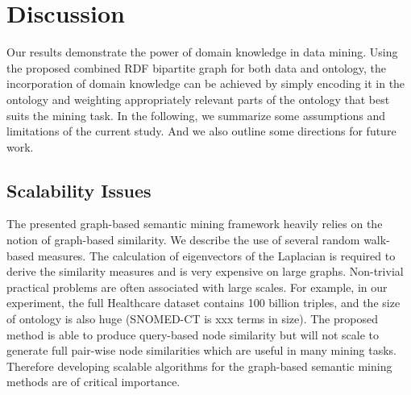 \section{Discussion}
\label{sec:discussion}

Our results demonstrate the power of domain knowledge in data mining. Using the proposed combined RDF bipartite graph for both data and ontology, the incorporation of domain knowledge can be achieved by simply encoding it in the ontology and weighting appropriately relevant parts of the ontology that best suits the mining task. In the following, we summarize some assumptions and limitations of
the current study. And we also outline some directions for future work. 

\subsection{Scalability Issues}

The presented graph-based semantic mining framework heavily relies on the notion of graph-based similarity. We describe the use of several random walk-based measures. The calculation of eigenvectors of the Laplacian is required to derive the similarity measures and is very expensive on large graphs. Non-trivial practical problems are often associated with large scales. For example, in our experiment, the full Healthcare dataset contains 100 billion triples, and the size of ontology is also huge (SNOMED-CT is xxx terms in size). The proposed method is able to produce query-based node similarity but will not scale to generate full pair-wise node similarities which are useful in many mining tasks. Therefore developing scalable algorithms for the graph-based semantic mining methods are of critical importance.

